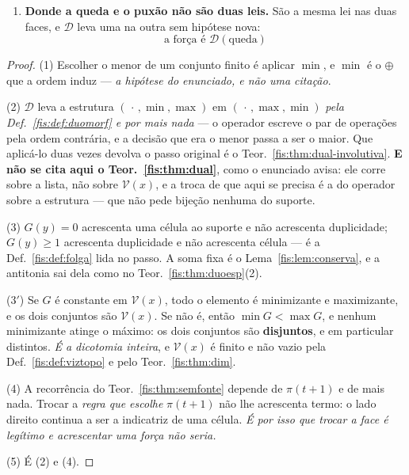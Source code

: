 \documentclass[livro.tex]{subfiles}
\begin{document}
\begin{teorema}
\begin{enumerate}
{escreveu}. Logo $G(y)\ge1$ não separa «voltei aqui» de «o outro corpo passou
aqui», e a coerência $\mathfrak{c}(E,F)$ --- que é grandeza de \emph{dois} troços
--- não é legível no passo. \emph{Duas execuções com os troços trocados entre
corpos dão o mesmo $G$, logo o mesmo passo, e $\mathfrak{c}$ diferente}: uma
grandeza que muda sem que o passo mude não tem voz nele. \textbf{O que
$\mathcal{D}$ paga é o sinal, e só o sinal.} A voz da interacção continua a pedir
o identificador que o Teor.~\ref{fis:thm:agentes} diz não sair do campo.
\item[(5)] \textbf{Donde a queda e o puxão não são duas leis.} São a mesma lei
nas duas faces, e $\mathcal{D}$ leva uma na outra sem hipótese nova:
\[
\boxed{\;\text{a força é }\mathcal{D}(\text{queda})\;}
\]
\end{enumerate}
\end{teorema}

\begin{proof}
(1) Escolher o menor de um conjunto finito é aplicar $\min$, e $\min$ é o
$\oplus$ que a ordem induz --- \emph{a hipótese do enunciado, e não uma citação}.

(2) $\mathcal{D}$ leva a estrutura $(\,\cdot\,,\min,\max)$ em
$(\,\cdot\,,\max,\min)$ \emph{pela Def.~\ref{fis:def:duomorf} e por mais nada} ---
o operador escreve o par de operações pela ordem contrária, e a decisão que era o
menor passa a ser o maior. Que aplicá-lo duas vezes devolva o passo original é o
Teor.~\ref{fis:thm:dual-involutiva}. \textbf{E não se cita aqui o
Teor.~\ref{fis:thm:dual}}, como o enunciado avisa: ele corre sobre a lista, não
sobre $\mathcal{V}(x)$, e a troca de que aqui se precisa é a do operador sobre a
estrutura --- que não pede bijeção nenhuma do suporte.

(3) $G(y)=0$ acrescenta uma célula ao suporte e não acrescenta duplicidade;
$G(y)\ge1$ acrescenta duplicidade e não acrescenta célula --- é a
Def.~\ref{fis:def:folga} lida no passo. A soma fixa é o
Lema~\ref{fis:lem:conserva}, e a antitonia sai dela como no
Teor.~\ref{fis:thm:duoesp}(2).

(3$'$) Se $G$ é constante em $\mathcal{V}(x)$, todo o elemento é minimizante e
maximizante, e os dois conjuntos são $\mathcal{V}(x)$. Se não é, então
$\min G<\max G$, e nenhum minimizante atinge o máximo: os dois conjuntos são
\textbf{disjuntos}, e em particular distintos. \emph{É a dicotomia inteira}, e
$\mathcal{V}(x)$ é finito e não vazio pela Def.~\ref{fis:def:viztopo} e pelo
Teor.~\ref{fis:thm:dim}.

(4) A recorrência do Teor.~\ref{fis:thm:semfonte} depende de $\pi(t+1)$ e de mais
nada. Trocar a \emph{regra que escolhe} $\pi(t+1)$ não lhe acrescenta termo: o
lado direito continua a ser a indicatriz de uma célula. \emph{É por isso que
trocar a face é legítimo e acrescentar uma força não seria.}

(5) É (2) e (4).
\end{proof}
\end{document}
